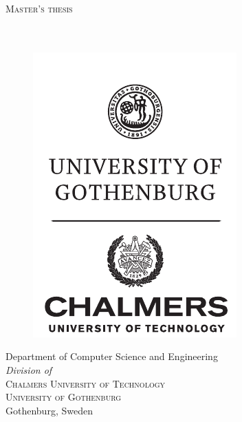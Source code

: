 \newpage
\thispagestyle{empty}
\begin{center}
	\textsc{\large Master's thesis \the\year}\\[4cm]		%
	\textbf{\Large \multiLineTitle{0.2cm}} \\[1cm]
	{\large \oneLineSubtitle}\\[1cm]
	{\large \authorfirstname{} \authorlastname{}}
	
	\vfill	
	\begin{figure}[H]
	\centering
	\includegraphics[width=0.25\pdfpagewidth]{figure/auxiliary/ChGULogoHog.pdf}
	\end{figure}	\vspace{5mm}	
	
	Department of Computer Science and Engineering\\
	\emph{Division of \division{}}\\
	\textsc{Chalmers University of Technology} \\
	\textsc{University of Gothenburg} \\
	Gothenburg, Sweden \the\year \\
\end{center}


\newpage
\thispagestyle{plain}
\vspace*{4.5cm}
\noindent \oneLineTitle\\
\oneLineSubtitle\\
\authorfirstname{} \authorlastname{}

